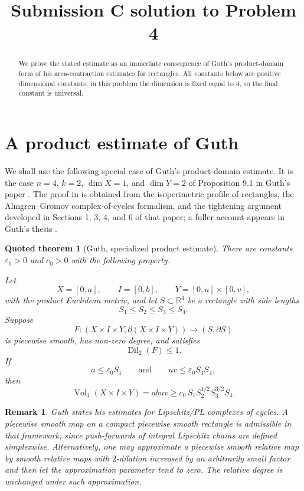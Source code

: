 \documentclass[11pt]{article}
\newtheorem{quotedtheorem}{Quoted theorem}
\newtheorem{remark}{Remark}
\newcommand{\R}{\mathbb{R}}
\newcommand{\Vol}{\operatorname{Vol}}
\newcommand{\Dil}{\operatorname{Dil}}
\begin{document}
\title{Submission C solution to Problem 4}
\date{}
\maketitle


\begin{abstract}
We prove the stated estimate as an immediate consequence of Guth's
product-domain form of his area-contraction estimates for rectangles.
All constants below are positive dimensional constants; in this problem
the dimension is fixed equal to \(4\), so the final constant is universal.
\end{abstract}

\section{A product estimate of Guth}

We shall use the following special case of Guth's product-domain estimate.
It is the case \(n=4\), \(k=2\), \(\dim X=1\), and \(\dim Y=2\) of
Proposition 9.1 in Guth's paper \cite[Proposition 9.1]{GuthAreaExpanding}.
The proof in \cite{GuthAreaExpanding} is obtained from the isoperimetric
profile of rectangles, the Almgren--Gromov complex-of-cycles formalism,
and the tightening argument developed in Sections 1, 3, 4, and 6 of that
paper; a fuller account appears in Guth's thesis \cite{GuthThesis}.

\begin{quotedtheorem}[Guth, specialized product estimate]\label{qt:guth}
There are constants \(\varepsilon_0>0\) and \(c_0>0\) with the following
property.

Let
\[
X=[0,a],\qquad I=[0,b],\qquad Y=[0,u]\times[0,v],
\]
with the product Euclidean metric, and let \(S\subset \R^4\) be a rectangle
with side lengths
\[
S_1\leq S_2\leq S_3\leq S_4.
\]
Suppose
\[
F:(X\times I\times Y,\partial(X\times I\times Y))\longrightarrow
(S,\partial S)
\]
is piecewise smooth, has non-zero degree, and satisfies
\[
\Dil_2(F)\leq 1.
\]
If
\[
a\leq \varepsilon_0 S_1
\qquad\text{and}\qquad
uv\leq \varepsilon_0 S_3S_4,
\]
then
\[
\Vol_4(X\times I\times Y)
=abuv
\geq
c_0\,S_1S_2^{1/2}S_3^{3/2}S_4.
\]
\end{quotedtheorem}

\begin{remark}
Guth states his estimates for Lipschitz/PL complexes of cycles. A
piecewise smooth map on a compact piecewise smooth rectangle is admissible
in that framework, since push-forwards of integral Lipschitz chains are
defined simplexwise. Alternatively, one may approximate a piecewise smooth
relative map by smooth relative maps with \(2\)-dilation increased by an
arbitrarily small factor and then let the approximation parameter tend to
zero. The relative degree is unchanged under such approximation.
\end{remark}
\end{document}
